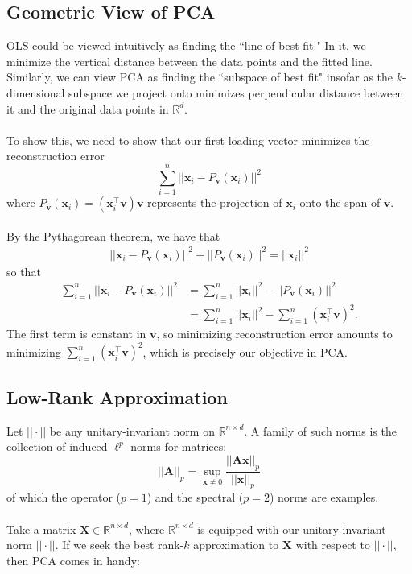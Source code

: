 \documentclass{article}
\begin{document}
\subsection*{Geometric View of PCA}
OLS could be viewed intuitively as finding the ``line of best fit." In it, we minimize the vertical distance between the data points and the fitted line. Similarly, we can view PCA as finding the ``subspace of best fit" insofar as the $k$-dimensional subspace we project onto minimizes perpendicular distance between it and the original data points in $\mathbb{R}^d$.
\\ \\
To show this, we need to show that our first loading vector minimizes the reconstruction error
\[
\sum_{i=1}^n ||\textbf{x}_i - P_\textbf{v}(\textbf{x}_i)||^2
\]
where $P_\textbf{v}(\textbf{x}_i) = (\textbf{x}_i^\top\textbf{v})\textbf{v}$ represents the projection of $\textbf{x}_i$ onto the span of $\textbf{v}$.
\\ \\
By the Pythagorean theorem, we have that
\begin{align*}
||\textbf{x}_i - P_\textbf{v}(\textbf{x}_i)||^2 + ||P_\textbf{v}(\textbf{x}_i)||^2 = ||\textbf{x}_i||^2 
\end{align*}
so that
\begin{align*}
\sum_{i=1}^n ||\textbf{x}_i - P_\textbf{v}(\textbf{x}_i)||^2 &= \sum_{i=1}^n ||\textbf{x}_i||^2-||P_\textbf{v}(\textbf{x}_i)||^2 \\
&= \sum_{i=1}^n ||\textbf{x}_i||^2 - \sum_{i=1}^n (\textbf{x}_i^\top\textbf{v})^2.
\end{align*}
The first term is constant in $\textbf{v}$, so minimizing reconstruction error amounts to minimizing $\sum_{i=1}^n (\textbf{x}_i^\top\textbf{v})^2$, which is precisely our objective in PCA. 

\subsection*{Low-Rank Approximation}
Let $||\cdot||$ be any unitary-invariant norm on $\mathbb{R}^{n \times d}$. A family of such norms is the collection of induced $\ell^p$-norms for matrices: 
\[
||\textbf{A}||_p = \sup_{\textbf{x} \neq 0} \frac{||\textbf{A}\textbf{x}||_p}{||\textbf{x}||_p}
\]
of which the operator ($p = 1$) and the spectral ($p=2$) norms are examples.
\\ \\
Take a matrix $\textbf{X} \in \mathbb{R}^{n \times d}$, where $\mathbb{R}^{n \times d}$ is equipped with our unitary-invariant norm $||\cdot||$. If we seek the best rank-$k$ approximation to $\textbf{X}$ with respect to $||\cdot||$, then PCA comes in handy: 
\end{document}
